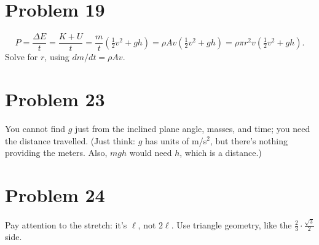 \documentclass[11pt]{article}
\begin{document}
\section*{Problem 19}
\[
P=\frac{\Delta E}{t}=\frac{K+U}{t}=\frac mt\left(\tfrac12v^2+gh\right)=\rho Av\left(\tfrac12v^2+gh\right)=\rho\pi r^2v\left(\tfrac12v^2+gh\right).
\]
Solve for $r$, using $dm/dt=\rho Av$.

\section*{Problem 23}
You cannot find $g$ just from the inclined plane angle, masses, and time; you need the distance travelled. (Just think: $g$ has units of m/s$^2$, but there's nothing providing the meters. Also, $mgh$ would need $h$, which is a distance.)

\section*{Problem 24}
Pay attention to the stretch: it's $\ell$, not $2\ell$.
Use triangle geometry, like the $\tfrac23\cdot\tfrac{\sqrt3}{2}$ side.
\end{document}
